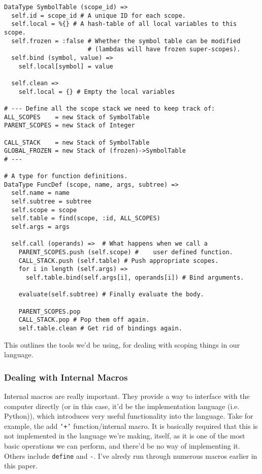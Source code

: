 \documentclass{article}
\newcommand{\code}[1]{\texttt{#1}}
\begin{document}
\begin{verbatim}
DataType SymbolTable (scope_id) =>
  self.id = scope_id # A unique ID for each scope.
  self.local = %{} # A hash-table of all local variables to this scope.
  self.frozen = :false # Whether the symbol table can be modified
                       # (lambdas will have frozen super-scopes).
  self.bind (symbol, value) =>
    self.local[symbol] = value

  self.clean =>
    self.local = {} # Empty the local variables

# --- Define all the scope stack we need to keep track of:
ALL_SCOPES    = new Stack of SymbolTable
PARENT_SCOPES = new Stack of Integer

CALL_STACK    = new Stack of SymbolTable
GLOBAL_FROZEN = new Stack of (frozen)->SymbolTable
# ---

# A type for function definitions.
DataType FuncDef (scope, name, args, subtree) =>
  self.name = name
  self.subtree = subtree
  self.scope = scope
  self.table = find(scope, :id, ALL_SCOPES)
  self.args = args

  self.call (operands) =>  # What happens when we call a
    PARENT_SCOPES.push (self.scope) #    user defined function.
    CALL_STACK.push (self.table) # Push appropriate scopes.
    for i in length (self.args) =>
      self.table.bind(self.args[i], operands[i]) # Bind arguments.

    evaluate(self.subtree) # Finally evaluate the body.

    PARENT_SCOPES.pop
    CALL_STACK.pop # Pop them off again.
    self.table.clean # Get rid of bindings again.
\end{verbatim}
      This outlines the tools we'd be using, for dealing with scoping things in
      our language.
      \clearpage

    \subsubsection{Dealing with Internal Macros}
      Internal macros are really important. They provide a way to interface with
      the computer directly (or in this case, it'd be the implementation
      language (i.e. Python)), which introduces very useful functionality into
      the language. Take for example, the add \code{`+'} function/internal macro.
      It is basically required that this is not implemented in the language we're
      making, itself, as it is one of the most basic operations we can perform,
      and there'd be no way of implementing it. Others include \code{define} and
      \code{-}. I've alredy run through numerous macros earlier in this paper.
\end{document}
